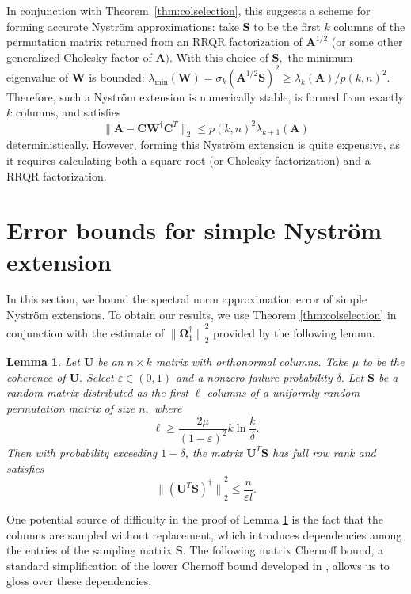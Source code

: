 \documentclass[11pt,letterpaper,twoside,reqno,nosumlimits]{amsart}
\def\pinv{\dagger}
\def\transp{T}
\newcommand{\mat}[1]{\ensuremath{\mathbf{#1}}}
\newcommand{\norm}[1]{\ensuremath{\big\|#1\big\|}}
\newcommand{\snorm}[1]{\ensuremath{\big\|#1\big\|_2}}
\newcommand{\lambdamin}[1]{\ensuremath{\lambda_{\mathrm{min}}\left(#1\right)}}
\newtheorem{lemma}{Lemma}
\theoremstyle{remark}
\begin{document}
In conjunction with Theorem~\ref{thm:colselection}, this suggests a scheme for forming accurate Nystr\"om approximations: take $\mat{S}$ to be the first $k$ columns of the permutation matrix returned from an RRQR factorization of $\mat{A}^{1/2}$ (or some other generalized Cholesky factor of $\mat{A}).$ With this choice of $\mat{S},$ the minimum eigenvalue of $\mat{W}$ is bounded: $\lambdamin{\mat{W}} = \sigma_k(\mat{A}^{1/2} \mat{S})^2 \geq \lambda_k(\mat{A})/p(k,n)^2.$ Therefore, such a Nystr\"om extension is numerically stable, is formed from exactly $k$ columns, and satisfies 
\[
 \snorm{\mat{A} - \mat{C}\mat{W}^\pinv \mat{C}^\transp} \leq p(k,n)^2 \lambda_{k+1}(\mat{A})
\]
deterministically. However, forming this Nystr\"om extension is quite expensive, as it requires calculating both a square root (or Cholesky factorization) and a RRQR factorization.


\section{ Error bounds for simple Nystr\"om extension}
\label{sec:naiveproof}

In this section, we bound the spectral norm approximation error of simple Nystr\"om extensions. To obtain our results, we use Theorem \ref{thm:colselection} in conjunction with the estimate of $\norm{\mat{\Omega}_1^\pinv}_2^2$ provided by the following lemma. 

\begin{lemma}
Let $\mat{U}$ be an $n \times k$ matrix with orthonormal columns. Take $\mu$ to be the coherence of $\mat{U}.$
Select $\varepsilon \in (0,1)$ and a nonzero failure probability $\delta.$ Let $\mat{S}$ be a random matrix distributed as the first $\ell$ columns of a uniformly random permutation matrix of size $n,$ where
\[
 \ell \geq \frac{2\mu}{(1-\varepsilon)^2}k\ln\frac{k}{\delta}.
\]
Then with probability exceeding $1- \delta$, the matrix $\mat{U}^\transp\mat{S}$ has full row rank and satisfies
\[
 \norm{(\mat{U}^\transp \mat{S})^\pinv}_2^2 \leq \frac{n}{\varepsilon l}.
\]
 \label{lem:omega1normbound}
\end{lemma}

One potential source of difficulty in the proof of Lemma \ref{lem:omega1normbound} is the fact that the columns are sampled without replacement, which introduces dependencies among the entries of the sampling matrix $\mat{S}.$ The following matrix Chernoff bound, a standard simplification of the lower Chernoff bound developed in \cite[Theorem 2.2]{T11}, allows us to gloss over these dependencies.
\end{document}
